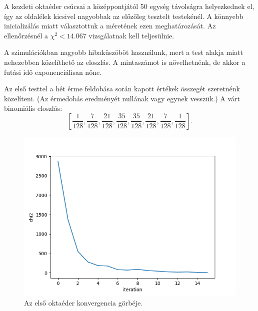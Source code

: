 \newpage


A kezdeti oktaéder csúcsai a középpontjától 50 egység távolságra helyezkednek el, így az oldalélek kicsivel nagyobbak az előzőleg tesztelt testekénél.
A könnyebb inicializálás miatt választottuk a méretének ezen meghatározását.
Az ellenőrzésnél a $\chi^2 < 14.067$ vizsgálatnak kell teljesülnie.

\begin{remark}
A szimulációkban nagyobb hibaküszöböt használunk, mert a test alakja miatt nehezebben közelíthető az eloszlás.
A mintaszámot is növelhetnénk, de akkor a futási idő exponenciálisan nőne.
\end{remark}

Az első testtel a hét érme feldobása során kapott értékek összegét szeretnénk közelíteni.
(Az érmedobás eredményét nullának vagy egynek vesszük.)
A várt binomiális eloszlás: 
\[
\left[\frac{1}{128}, \frac{7}{128}, \frac{21}{128}, \frac{35}{128}, \frac{35}{128}, \frac{21}{128}, \frac{7}{128}, \frac{1}{128}\right].
\]

\begin{figure}[h!]
	\centering
	\includegraphics[scale=0.7]{images/octahedron_01.png}
	\caption{Az első oktaéder konvergencia görbéje.}
	\label{fig:octa01}
\end{figure}

